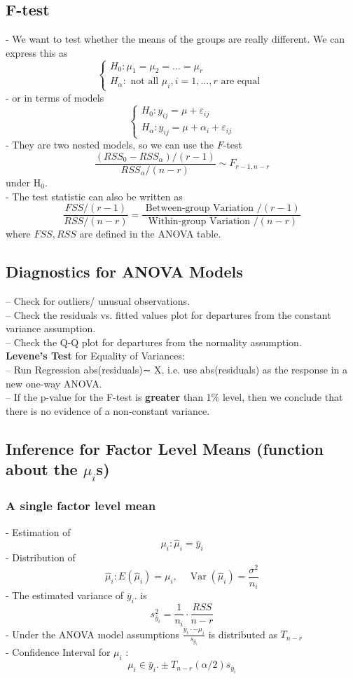 \documentclass[11pt,a4paper]{article}
\begin{document}
\subsection{F-test}
- We want to test whether the means of the groups are really different. We can express this as
$$
\left\{\begin{array}{l}
H_{0}: \mu_{1}=\mu_{2}=\ldots=\mu_{r} \\
H_{\alpha}: \text { not all } \mu_{i}, i=1, \ldots, r \text { are equal }
\end{array}\right.
$$
- or in terms of models
$$
\left\{\begin{array}{l}
H_{0}: y_{i j}=\mu+\varepsilon_{i j} \\
H_{\alpha}: y_{i j}=\mu+\alpha_{i}+\varepsilon_{i j}
\end{array}\right.
$$
- They are two nested models, so we can use the $F$-test
$$
\frac{\left(R S S_{0}-R S S_{\alpha}\right) /(r-1)}{R S S_{\alpha} /(n-r)} \sim F_{r-1, n-r}
$$
under $\mathrm{H}_{0}$.\\
- The test statistic can also be written as
$$
\frac{F S S /(r-1)}{R S S /(n-r)}=\frac{\text { Between-group Variation } /(r-1)}{\text { Within-group Variation } /(n-r)}
$$
where $F S S, R S S$ are defined in the ANOVA table.

\subsection{Diagnostics for ANOVA Models}
– Check for outliers/ unusual observations.\\
– Check the residuals vs. ﬁtted values plot for departures from the constant variance assumption.\\
– Check the Q-Q plot for departures from the normality assumption.\\
\textbf{Levene’s Test} for Equality of Variances:\\
– Run Regression abs(residuals)∼ X, i.e. use abs(residuals) as the response in a new one-way ANOVA.\\
– If the p-value for the F-test is \textbf{greater} than 1\% level, then we conclude that there is no evidence of a non-constant variance.

\subsection{Inference for Factor Level Means (function about the $\mu_i$s)}
\subsubsection{A single factor level mean}
- Estimation of $$\mu_{i}: \hat{\mu}_{i}=\bar{y}_{i}$$
- Distribution of $$\hat{\mu}_{i}: E\left(\hat{\mu}_{i}\right)=\mu_{i}, \quad \operatorname{Var}\left(\hat{\mu}_{i}\right)=\frac{\sigma^{2}}{n_{i}}$$
- The estimated variance of $\bar{y}_{i}$. is $$s_{\bar{y}_{i}}^{2}=\frac{1}{n_{i}} \cdot \frac{R S S}{n-r}$$
- Under the ANOVA model assumptions
$\frac{\bar{y}_{i} \cdot-\mu_{i}}{s_{\bar{y}_{i}}}$ is distributed as $T_{n-r}$\\
- Confidence Interval for $\mu_{i}$ :
$$
\mu_{i} \in \bar{y}_{i} . \pm T_{n-r}(\alpha / 2) s_{\bar{y}_{i}}
$$
\end{document}
